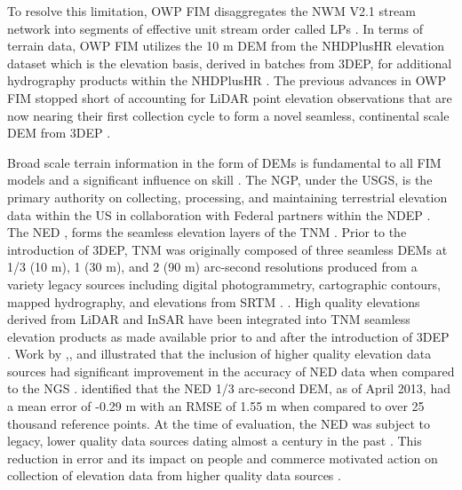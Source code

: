 \documentclass[water,article,submit,pdftex,moreauthors]{dependencies/Definitions/mdpi}
\begin{document}
To resolve this limitation, \ac{OWP} \ac{FIM} disaggregates the \ac{NWM} \ac{V2.1} stream network into segments of effective unit stream order called \acp{LP} \cite{aristizabal2022extending}.
In terms of terrain data, \ac{OWP} \ac{FIM} utilizes the 10 \ac{m} \ac{DEM} from the \ac{NHDPlusHR} elevation dataset which is the elevation basis, derived in batches from \ac{3DEP}, for additional hydrography products within the \ac{NHDPlusHR} \cite{aristizabal2022extending,moore2019user}.
The previous advances in \ac{OWP} \ac{FIM} stopped short of accounting for \ac{LiDAR} point elevation observations \cite{aristizabal2022extending} that are now nearing their first collection cycle to form a novel seamless, continental scale \ac{DEM} from \ac{3DEP} \cite{usgs2022status,usgs2022partnerships}.

Broad scale terrain information in the form of \acp{DEM} is fundamental to all \ac{FIM} models and a significant influence on skill \cite{bales2009sources,dobbs2010evaluation,wang2005comparison,merwade2008uncertainty,witt2015evaluation}. 
The \ac{NGP}, under the \ac{USGS}, is the primary authority on collecting, processing, and maintaining terrestrial elevation data within the \ac{US} in collaboration with Federal partners within the \ac{NDEP} \cite{omb2016circularA16,dewberry2011final,national2007elevation,national2009mapping,sugarbaker20143d}.
The \ac{NED} \cite{gesch2002national,gesch2007digital}, forms the seamless elevation layers of the \ac{TNM} \cite{gesch2009national,archuleta2017national,arundel2015preparing,arundel2018assimilation,kelmelis2003national}.
Prior to the introduction of \ac{3DEP}, \ac{TNM} was originally composed of three seamless \acp{DEM} at 1/3 (10 \ac{m}), 1 (30 \ac{m}), and 2 (90 \ac{m}) arc-second resolutions produced from a variety legacy sources including digital photogrammetry, cartographic contours, mapped hydrography, and elevations from \ac{SRTM} . \cite{gesch2002national,gesch2007digital,arundel2015preparing}.
High quality elevations derived from \ac{LiDAR} and \ac{InSAR} have been integrated into \ac{TNM} seamless elevation products as made available prior to and after the introduction of \ac{3DEP} \cite{snyder2013national,gesch2002national,arundel2015preparing}.
Work by \citet{gesch2014accuracy},\cite{gesch2007digital}, and \citet{dobbs2010evaluation} illustrated that the inclusion of higher quality elevation data sources had significant improvement in the accuracy of \ac{NED} data when compared to the \ac{NGS} \cite{roman2010geodesy}.
\citet{gesch2014accuracy} identified that the \ac{NED} 1/3 arc-second \ac{DEM}, as of April 2013, had a mean error of -0.29 \ac{m} with an \ac{RMSE} of 1.55 \ac{m} when compared to over 25 thousand reference points. 
At the time of evaluation, the \ac{NED} was subject to legacy, lower quality data sources dating almost a century in the past \cite{sugarbaker20143d,gesch2014accuracy,gesch2007digital}.
This reduction in error and its impact on people and commerce \cite{dewberry2011final} motivated action on collection of elevation data from higher quality data sources \cite{sugarbaker20143d}. 
\end{document}
